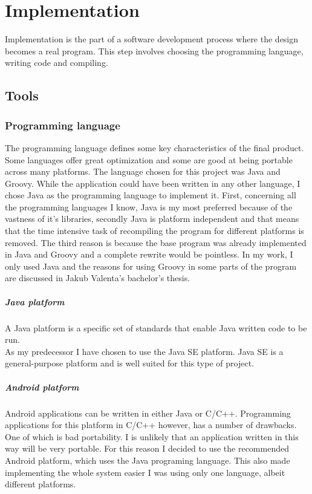\documentclass[11pt,twoside,a4paper]{book}
\begin{document}
\chapter{Implementation}
Implementation is the part of a software development process where the design becomes a real program. This step involves choosing the programming language, writing code and compiling.

\section{Tools}
\subsection{Programming language}
The programming language defines some key characteristics of the final product. Some languages offer great optimization and some are good at being portable across many platforms. The language chosen for this project was Java and Groovy\cite{whatIsGroovy}. While the application could have been written in any other language, I chose Java as the programming language to implement it. First, concerning all the programming languages I know, Java is my most preferred because of the vastness of it's libraries, secondly Java is platform independent and that means that the time intensive task of recompiling the program for different platforms is removed. The third reason is because the base program was already implemented in Java and Groovy and a complete rewrite would be pointless. In my work, I only used Java and the reasons for using Groovy in some parts of the program are discussed in Jakub Valenta's bachelor's thesis\cite{bakalarkaJV}.

\paragraph{Java platform}
A Java platform is a specific set of standards that enable Java written code to be run. \\
As my predecessor I have chosen to use the Java SE\cite{whatIsJavaSE} platform. Java SE is a general-purpose platform and is well suited for this type of project.

\paragraph{Android platform}
Android applications can be written in either Java or C/C++. Programming applications for this platform in C/C++ however, has a number of drawbacks. One of which is bad portability. I is unlikely that an application written in this way will be very portable. For this reason I decided to use the recommended Android platform, which uses the Java programing language. This also made implementing the whole system easier I was using only one language, albeit different platforms.
\end{document}
